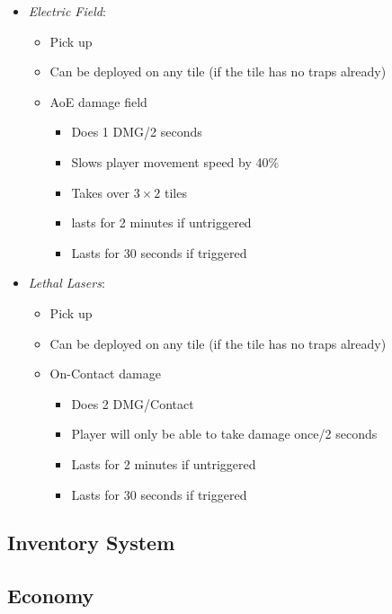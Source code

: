 \documentclass[14pts]{report}
\begin{document}
\begin{itemize}
    \begin{itemize}
        \item \emph{Electric Field}:
        \begin{itemize}
            \item Pick up
            \item Can be deployed on any tile (if the tile has no traps already)
            \item AoE damage field
            \begin{itemize}
                \item Does 1 DMG/2 seconds
                \item Slows player movement speed by 40\%
                \item Takes over $3\times2$ tiles
                \item lasts for 2 minutes if untriggered
                \item Lasts for 30 seconds if triggered
            \end{itemize}
        \end{itemize}
        \item \emph{Lethal Lasers}:
        \begin{itemize}
            \item Pick up
            \item Can be deployed on any tile (if the tile has no traps already)
            \item On-Contact damage
            \begin{itemize}
                \item Does 2 DMG/Contact
                \item Player will only be able to take damage once/2 seconds
                \item Lasts for 2 minutes if untriggered
                \item Lasts for 30 seconds if triggered
            \end{itemize}
        \end{itemize}
    \end{itemize}
\end{itemize}

\subsection{Inventory System}
\subsection{Economy}
\end{document}
